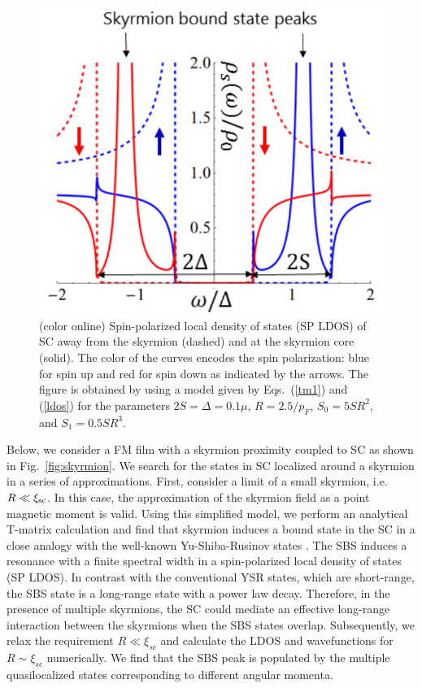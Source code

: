 \documentclass[twocolumn,showpacs,floatfix,longbibliography]{revtex4-1}
\begin{document}
\begin{figure} \centering
	\includegraphics[width=0.7\linewidth]{fig2}
	\caption{(color online) Spin-polarized local density of states (SP LDOS) of SC away from the skyrmion (dashed) and at the skyrmion core (solid). The color of the curves encodes the spin polarization: blue for spin up and red for spin down as indicated by the arrows. The figure is obtained by using a model given by Eqs.~(\ref{tm1}) and (\ref{ldos}) for the parameters $2S = \Delta = 0.1 \mu$, $R = 2.5/p_F$, $S_0 = 5SR^2$, and $S_1 = 0.5 SR^3$.} \label{fig:LDOS}
\end{figure}


Below, we consider a FM film with a skyrmion proximity coupled to SC as shown in Fig.~\ref{fig:skyrmion}. We search for the states in SC localized around a skyrmion in a series of approximations. First, consider a limit of a small skyrmion, i.e. $R\ll \xi_{\rm sc}$.  In this case, the approximation of the skyrmion field as a point magnetic moment is valid. Using this simplified model, we perform an analytical T-matrix calculation and find that skyrmion induces a bound state in the SC in a close analogy with the well-known Yu-Shiba-Rusinov states \cite{Yu,Shiba,Rusinov,Balatsky2006}. The SBS induces a resonance with a finite spectral width in a spin-polarized local density of states (SP LDOS). In contrast with the conventional YSR states, which are short-range, the SBS state is a long-range state with a power law decay. Therefore, in the presence of multiple skyrmions, the SC could mediate an effective long-range interaction between the skyrmions \cite{Yao2014} when the SBS states overlap. Subsequently, we relax the requirement $R\ll \xi_{sc}$ and calculate the LDOS and wavefunctions for $R\sim \xi_{sc}$ numerically. We find that the SBS peak is populated by the multiple quasilocalized states corresponding to different angular momenta.
\end{document}
